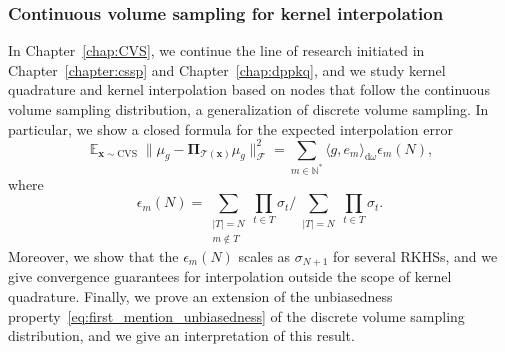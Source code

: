 \documentclass[twoside,11pt]{book}
\numberwithin{theorem}{chapter}
\numberwithin{definition}{chapter}
\numberwithin{proposition}{chapter}
\numberwithin{corollary}{chapter}
\numberwithin{example}{chapter}
\numberwithin{lemma}{chapter}
\numberwithin{assumption}{chapter}
\numberwithin{equation}{chapter}
\numberwithin{figure}{chapter}
\DeclareMathOperator{\EX}{\mathbb{E}}
\DeclareMathOperator{\F}{\mathcal{F}}
\begin{document}



\subsubsection{Continuous volume sampling for kernel interpolation}
In Chapter~\ref{chap:CVS}, we continue the line of research initiated in Chapter~\ref{chapter:cssp} and Chapter~\ref{chap:dppkq}, and we study kernel quadrature and kernel interpolation based on nodes that follow the  continuous volume sampling distribution, a generalization of discrete volume sampling. In particular, we show a closed formula for the expected interpolation error
\begin{equation}
\EX_{\bm{x} \sim \mathrm{CVS}} \|\mu_{g} - \bm{\Pi}_{\mathcal{T}(\bm{x})} \mu_{g}\|_{\F}^{2} = \sum\limits_{m \in \mathbb{N}^{*}} \langle g,e_{m} \rangle_{\mathrm{d}\omega} \epsilon_{m}(N),
\end{equation}
where
\begin{equation}
\epsilon_{m}(N) = \sum\limits_{\substack{|T| = N\\ m \notin T}} \prod\limits_{t \in T} \sigma_{t} \bigg/\sum\limits_{\substack{|T| = N}} \prod\limits_{t \in T} \sigma_{t}.
\end{equation}
Moreover, we show that the $\epsilon_{m}(N)$ scales as $\sigma_{N+1}$ for several RKHSs, and we give convergence guarantees for interpolation outside the scope of kernel quadrature. Finally, we prove an extension of the unbiasedness property~\eqref{eq:first_mention_unbiasedness} of the discrete volume sampling distribution, and we give an interpretation of this result.
\end{document}

